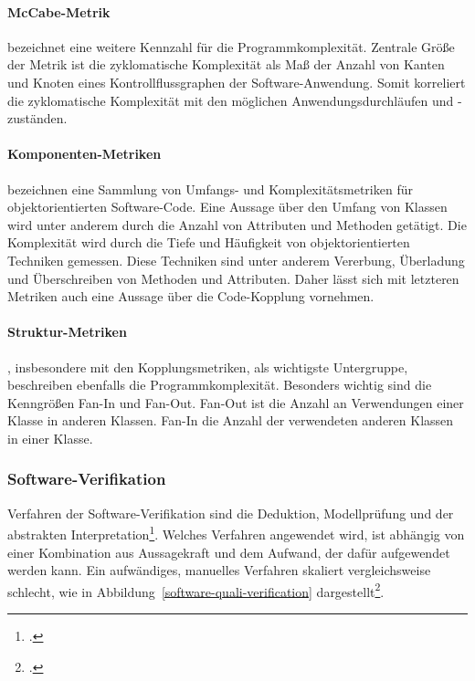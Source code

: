 \paragraph{McCabe-Metrik} bezeichnet eine weitere Kennzahl für die Programmkomplexität. Zentrale Größe der Metrik ist die \glqq zyklomatische Komplexität\grqq{} als Maß der Anzahl von Kanten und Knoten eines Kontrollflussgraphen der Software-Anwendung. Somit korreliert die zyklomatische Komplexität mit den möglichen Anwendungsdurchläufen und -zuständen.

\paragraph{Komponenten-Metriken} bezeichnen eine Sammlung von Umfangs- und Komplexitätsmetriken für objektorientierten Software-Code. Eine Aussage über den Umfang von Klassen wird unter anderem durch die Anzahl von Attributen und Methoden getätigt. Die Komplexität wird durch die Tiefe und Häufigkeit von objektorientierten Techniken gemessen. Diese Techniken sind unter anderem Vererbung, Überladung und Überschreiben von Methoden und Attributen. Daher lässt sich mit letzteren Metriken auch eine Aussage über die Code-Kopplung vornehmen.

\paragraph{Struktur-Metriken}\label{par:structure-metrics}, insbesondere mit den Kopplungsmetriken, als wichtigste Untergruppe, beschreiben ebenfalls die Programmkomplexität. Besonders wichtig sind die Kenngrößen Fan-In und Fan-Out. Fan-Out ist die Anzahl an Verwendungen einer Klasse in anderen Klassen. Fan-In die Anzahl der verwendeten anderen Klassen in einer Klasse. 

\subsubsection{Software-Verifikation}
\label{subsubsec:base-verification}
Verfahren der Software-Verifikation sind die Deduktion, Modellprüfung und der abstrakten Interpretation\footcite[S. 333 ff][]{software-quality2008}. Welches Verfahren angewendet wird, ist abhängig von einer Kombination aus Aussagekraft und dem Aufwand, der dafür aufgewendet werden kann. Ein aufwändiges, manuelles Verfahren skaliert vergleichsweise schlecht, wie in Abbildung~\ref{software-quali-verification} dargestellt\footcite[S. 337][]{software-quality2008}.

